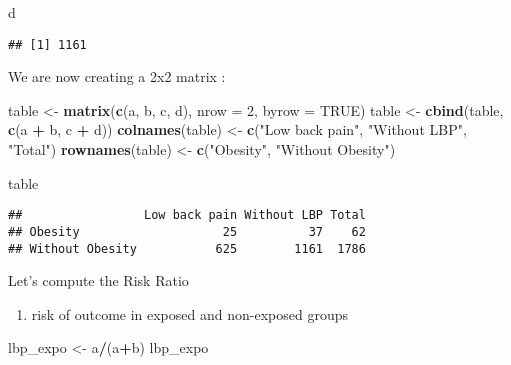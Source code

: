 \documentclass[
]{article}
\newenvironment{Shaded}{\begin{snugshade}}{\end{snugshade}}
\newcommand{\AttributeTok}[1]{\textcolor[rgb]{0.13,0.29,0.53}{#1}}
\newcommand{\ConstantTok}[1]{\textcolor[rgb]{0.56,0.35,0.01}{#1}}
\newcommand{\DecValTok}[1]{\textcolor[rgb]{0.00,0.00,0.81}{#1}}
\newcommand{\FunctionTok}[1]{\textcolor[rgb]{0.13,0.29,0.53}{\textbf{#1}}}
\newcommand{\NormalTok}[1]{#1}
\newcommand{\OtherTok}[1]{\textcolor[rgb]{0.56,0.35,0.01}{#1}}
\newcommand{\SpecialCharTok}[1]{\textcolor[rgb]{0.81,0.36,0.00}{\textbf{#1}}}
\newcommand{\StringTok}[1]{\textcolor[rgb]{0.31,0.60,0.02}{#1}}
\providecommand{\tightlist}{%
  \setlength{\itemsep}{0pt}\setlength{\parskip}{0pt}}
\begin{document}
\begin{Shaded}
\begin{Highlighting}[]
\NormalTok{d}
\end{Highlighting}
\end{Shaded}

\begin{verbatim}
## [1] 1161
\end{verbatim}

We are now creating a 2x2 matrix :

\begin{Shaded}
\begin{Highlighting}[]
\NormalTok{table }\OtherTok{\textless{}{-}} \FunctionTok{matrix}\NormalTok{(}\FunctionTok{c}\NormalTok{(a, b, c, d), }\AttributeTok{nrow =} \DecValTok{2}\NormalTok{, }\AttributeTok{byrow =} \ConstantTok{TRUE}\NormalTok{)}
\NormalTok{table }\OtherTok{\textless{}{-}} \FunctionTok{cbind}\NormalTok{(table, }\FunctionTok{c}\NormalTok{(a }\SpecialCharTok{+}\NormalTok{ b, c }\SpecialCharTok{+}\NormalTok{ d))}
\FunctionTok{colnames}\NormalTok{(table) }\OtherTok{\textless{}{-}} \FunctionTok{c}\NormalTok{(}\StringTok{"Low back pain"}\NormalTok{, }\StringTok{"Without LBP"}\NormalTok{, }\StringTok{"Total"}\NormalTok{)}
\FunctionTok{rownames}\NormalTok{(table) }\OtherTok{\textless{}{-}} \FunctionTok{c}\NormalTok{(}\StringTok{"Obesity"}\NormalTok{, }\StringTok{"Without Obesity"}\NormalTok{)}

\NormalTok{table}
\end{Highlighting}
\end{Shaded}

\begin{verbatim}
##                 Low back pain Without LBP Total
## Obesity                    25          37    62
## Without Obesity           625        1161  1786
\end{verbatim}

Let's compute the Risk Ratio

\begin{enumerate}
\def\labelenumi{\arabic{enumi}.}
\tightlist
\item
  risk of outcome in exposed and non-exposed groups
\end{enumerate}

\begin{Shaded}
\begin{Highlighting}[]
\NormalTok{lbp\_expo }\OtherTok{\textless{}{-}}\NormalTok{ a}\SpecialCharTok{/}\NormalTok{(a}\SpecialCharTok{+}\NormalTok{b)}
\NormalTok{lbp\_expo}
\end{Highlighting}
\end{Shaded}
\end{document}
